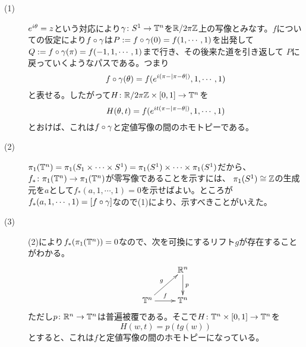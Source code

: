 \begin{sol} ${}$
\begin{description}
  \item[(1)] $e^{i {\theta}} = z$という対応により${\gamma} \colon S^1 \to {\mathbb T}^n$を${\mathbb R} / 2 \pi {\mathbb Z}$上の写像とみなす。$f$についての仮定により$f \circ {\gamma}$は$P := f \circ {\gamma}(0) = f(1, \cdots , 1)$を出発して$Q := f \circ {\gamma}(\pi) = f(-1, 1, \cdots , 1)$まで行き、その後来た道を引き返して
  $P$に戻っていくようなパスである。つまり
  \[
  f \circ {\gamma} ({\theta}) = f(e^{i(\pi - \left \lvert \pi - {\theta} \right \rvert)}, 1, \cdots , 1   )
  \]
  と表せる。したがって$H \colon {\mathbb R} / 2 \pi {\mathbb Z} \times [0,1] \to {\mathbb T}^n$を
  \[
  H({\theta}, t) = f(e^{it(\pi - \left \lvert \pi - {\theta} \right \rvert)}, 1, \cdots , 1 )
  \]
  とおけば、これは$f \circ {\gamma}$と定値写像の間のホモトピーである。
  \item[(2)] $\pi_1({\mathbb T}^n) = \pi_1(S_1 \times \cdots \times S^1) = \pi_1(S^1) \times \cdots \times \pi_1(S^1)$だから、$f_* \colon \pi_1({\mathbb T}^n) \to \pi_1({\mathbb T}^n)$が零写像であることを示すには、
  $\pi_1(S^1) \cong {\mathbb Z}$の生成元を$a$として$f_*(a,1, \cdots , 1) = 0$を示せばよい。ところが$f_*(a,1, \cdots , 1) =  [f \circ {\gamma}]$なので(1)により、示すべきことがいえた。
  \item[(3)] (2)により$f_* (\pi_1({\mathbb T}^n))=0$なので、次を可換にするリフト$g$が存在することがわかる。
  \[
  \xymatrix{
  {} & \R^n \ar[d]^p \\
  \T^n \ar[ru]^g \ar[r]^f & \T^n
  }
  \]
  ただし$p \colon {\mathbb R}^n \to {\mathbb T}^n$は普遍被覆である。そこで$H \colon {\mathbb T}^n \times [0,1] \to {\mathbb T}^n$を
  \[
  H(w,t) =  p( t g(w))
  \]
  とすると、これは$f$と定値写像の間のホモトピーになっている。
\end{description}
\end{sol}


\newpage


